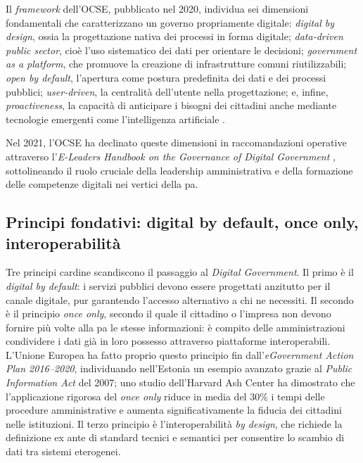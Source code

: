 Il \textit{framework} dell'OCSE, pubblicato nel 2020, individua sei dimensioni fondamentali che caratterizzano un governo propriamente digitale: \textit{digital by design}, ossia la progettazione nativa dei processi in forma digitale; \textit{data-driven public sector}, cioè l'uso sistematico dei dati per orientare le decisioni; \textit{government as a platform}, che promuove la creazione di infrastrutture comuni riutilizzabili; \textit{open by default}, l'apertura come postura predefinita dei dati e dei processi pubblici; \textit{user-driven}, la centralità dell'utente nella progettazione; e, infine, \textit{proactiveness}, la capacità di anticipare i bisogni dei cittadini anche mediante tecnologie emergenti come l'intelligenza artificiale \parencite{OECDDigitalGovFramework}.

Nel 2021, l'OCSE ha declinato queste dimensioni in raccomandazioni operative attraverso l'\textit{E-Leaders Handbook on the Governance of Digital Government} \parencite{OECDELeadersHandbook}, sottolineando il ruolo cruciale della leadership amministrativa e della formazione delle competenze digitali nei vertici della \gls{pa}.

\subsection{Principi fondativi: digital by default, once only, interoperabilità}

Tre principi cardine scandiscono il passaggio al \textit{Digital Government}. Il primo è il \textit{digital by default}: i servizi pubblici devono essere progettati anzitutto per il canale digitale, pur garantendo l'accesso alternativo a chi ne necessiti. Il secondo è il principio \textit{once only}, secondo il quale il cittadino o l'impresa non devono fornire più volte alla \gls{pa} le stesse informazioni: è compito delle amministrazioni condividere i dati già in loro possesso attraverso piattaforme interoperabili. L'Unione Europea ha fatto proprio questo principio fin dall'\textit{eGovernment Action Plan 2016--2020}, individuando nell'Estonia un esempio avanzato grazie al \textit{Public Information Act} del 2007; uno studio dell'Harvard Ash Center \textcite{OnceOnlyHarvard} ha dimostrato che l'applicazione rigorosa del \textit{once only} riduce in media del 30\% i tempi delle procedure amministrative e aumenta significativamente la fiducia dei cittadini nelle istituzioni. Il terzo principio è l'interoperabilità \textit{by design}, che richiede la definizione ex ante di standard tecnici e semantici per consentire lo scambio di dati tra sistemi eterogenei.

